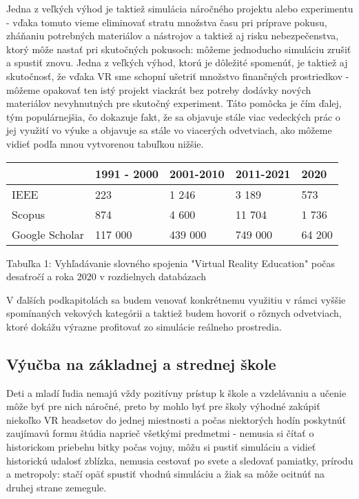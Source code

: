 \documentclass[10pt,twoside,slovak,a4paper]{article}
\begin{document}
Jedna z veľkých výhod je taktiež simulácia náročného projektu alebo experimentu  - vďaka tomuto vieme eliminovať stratu množstva času pri príprave pokusu, zháňaniu potrebných materiálov a nástrojov a taktiež aj risku nebezpečenstva, ktorý môže nastať pri skutočných pokusoch: môžeme jednoducho simuláciu zrušiť a spustiť znovu. Jedna z veľkých výhod, ktorú je dôležité spomenúť, je taktiež aj skutočnosť, že vďaka VR sme schopní ušetriť množstvo finančných prostriedkov - môžeme opakovať ten istý projekt viackrát bez potreby dodávky nových materiálov nevyhnutných pre skutočný experiment. Táto pomôcka je čím ďalej, tým populárnejšia, čo dokazuje fakt, že sa objavuje stále viac vedeckých prác o jej využití vo výuke \cite{vyucovanie} a objavuje sa stále vo viacerých odvetviach, ako môžeme vidieť podľa mnou vytvorenou tabuľkou nižšie.

\begin{center}
    \begin{tabular}{| l | l | l | l | l |}
    \hline
     & 1991 - 2000 & 2001-2010 & 2011-2021 & 2020 \\ \hline
    IEEE & 223 & 1 246 & 3 189 & 573\\ \hline
    Scopus & 874 & 4 600 & 11 704 & 1 736\\ \hline
    Google Scholar & 117 000 & 439 000 & 749 000 & 64 200 \\
    \hline
    \end{tabular}
\end{center}

Tabuľka 1: Vyhľadávanie slovného spojenia "Virtual Reality Education"  počas desaťročí a roka 2020 v rozdielnych databázach

 V ďalších podkapitolách sa budem venovať konkrétnemu využitiu v rámci vyššie spomínaných vekových kategórii a taktiež budem hovoriť o rôznych odvetviach, ktoré dokážu výrazne profitovať zo simulácie reálneho prostredia.

\subsection{Výučba na základnej a strednej škole} \label{deti}
Deti a mladí ľudia nemajú vždy pozitívny prístup k škole a vzdelávaniu a učenie môže byť pre nich náročné, preto by mohlo byť pre školy výhodné zakúpiť niekoľko VR headsetov do jednej miestnosti a počas niektorých hodín poskytnúť zaujímavú formu štúdia naprieč všetkými predmetmi - nemusia si čítať o historickom priebehu bitky počas vojny, môžu si pustiť simuláciu a vidieť historickú udalosť zblízka, nemusia cestovať po svete a sledovať pamiatky, prírodu a metropoly: stačí opäť spustiť vhodnú simuláciu a žiak sa môže ocitnúť na druhej strane zemegule.
\end{document}
